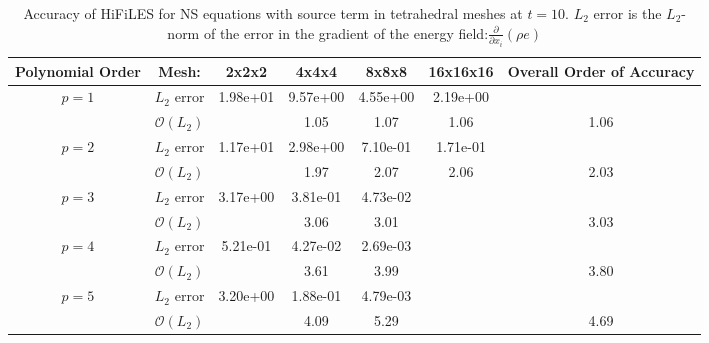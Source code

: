 \begin{table}[H]
\centering
\begin{tabular}{ c c c c c c c} 
  
 Polynomial Order & Mesh: & 2x2x2 & 4x4x4 & 8x8x8 & 16x16x16 & Overall Order of Accuracy \\ 
 \hline 
 \multirow{2}{*}{$p = 1$} & $L_2$ error & 1.98e+01 & 9.57e+00 & 4.55e+00 & 2.19e+00 &   \\ 
  
   & $\mathcal{O}(L_2)$ &   & 1.05 & 1.07 & 1.06 & 1.06 \\ 
 \hline 
 \multirow{2}{*}{$p = 2$} & $L_2$ error & 1.17e+01 & 2.98e+00 & 7.10e-01 & 1.71e-01 &   \\ 
  
   & $\mathcal{O}(L_2)$ &   & 1.97 & 2.07 & 2.06 & 2.03 \\ 
 \hline 
 \multirow{2}{*}{$p = 3$} & $L_2$ error & 3.17e+00 & 3.81e-01 & 4.73e-02 &   &   \\ 
  
   & $\mathcal{O}(L_2)$ &   & 3.06 & 3.01 &   & 3.03 \\ 
 \hline 
 \multirow{2}{*}{$p = 4$} & $L_2$ error & 5.21e-01 & 4.27e-02 & 2.69e-03 &   &   \\ 
  
   & $\mathcal{O}(L_2)$ &   & 3.61 & 3.99 &   & 3.80 \\ 
 \hline 
 \multirow{2}{*}{$p = 5$} & $L_2$ error & 3.20e+00 & 1.88e-01 & 4.79e-03 &   &   \\ 
  
   & $\mathcal{O}(L_2)$ &   & 4.09 & 5.29 &   & 4.69 \\ 
 \hline 
 \end{tabular}
\caption{Accuracy of HiFiLES for NS equations with source term in tetrahedral meshes at $t = 10$. $L_2$ error is the $L_2$-norm of the error in the gradient of the energy field:$\frac{\partial}{\partial x_i} (\rho e)$}
\label{table:tetsError2} 
 \end{table}
